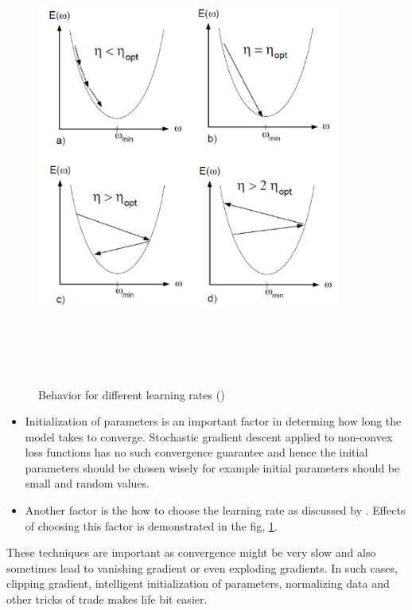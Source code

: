 \begin{enumerate}
\begin{figure}[H]
		\includegraphics[width=10cm,height=15cm,keepaspectratio]{files/learningRate.png}
		\caption{Behavior for different learning rates (\cite{lecun2012efficient})}
		\label{fig:learn}
	\end{figure}
	\begin{itemize}
		\item Initialization of parameters is an important factor in determing how long the model takes to converge. Stochastic gradient descent applied to non-convex loss functions has no such convergence guarantee and hence the initial parameters should be chosen wisely for example initial parameters should be small and random values.
		\item Another factor is the how to choose the learning rate as discussed by \cite{lecun2012efficient}. Effects of choosing this factor is demonstrated in the fig, \ref{fig:learn}.
	\end{itemize}
	These techniques are important as convergence might be very slow and also sometimes lead to vanishing gradient or even exploding gradients. In such cases, clipping gradient, intelligent initialization of parameters, normalizing data and other tricks of trade makes life bit easier.
\end{enumerate}	
